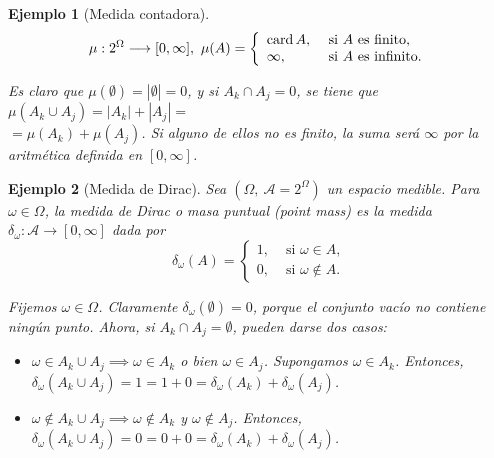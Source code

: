 \documentclass[11pt, a4paper]{article}
\newif\IfInSansMode
\newcommand{\w}{\omega}
\theoremstyle{theorem-style}
\theoremstyle{definition-style}
\theoremstyle{remark-style}
\theoremstyle{example-style}
\newtheorem{ejemplo}{Ejemplo}[section]
\begin{document}
\begin{ejemplo}[Medida contadora]
\[ 
 \mu: 2^\Omega\longrightarrow [0,\infty] , \
 \mu (A) = \left\{ \begin{array}{ll}
                               \text{card\,} A , & \text{ si } A \text{ es finito,}
                               \\
                               \infty , &  \text{ si } A \text{ es infinito.}
                              \end{array}
                              \right.
 \]
 
 Es claro que $\mu(\emptyset) = |\emptyset| = 0$, y si $A_k \cap A_j = 0$, se tiene que $\mu(A_k \cup A_j) = |A_k| + |A_j| = $\\ $= \mu(A_k) + \mu(A_j)$. Si alguno de ellos no es finito, la suma será $\infty$ por la aritmética definida en $[0,\infty]$.
	
\end{ejemplo}

\begin{ejemplo}[Medida de Dirac]
Sea $(\Omega,\ \mathscr A=2^\Omega)$ un espacio medible. Para $\omega\in\Omega$, la medida de Dirac  o masa puntual (point mass) es la medida $\delta_\omega:\mathscr A \longrightarrow [0,\infty ]$ dada por 
 \[
 \delta_\omega (A) = \left\{ \begin{array}{ll}
                                1, & \text{ si } \omega\in A,
                               \\
                               0 , &  \text{ si } \omega\not\in A.
                              \end{array}
                              \right.
 \]
 
 Fijemos $\omega \in \Omega$. Claramente $\delta_\omega(\emptyset) = 0$, porque el conjunto vacío no contiene ningún punto. Ahora, si $A_k \cap A_j = \emptyset$, pueden darse dos casos:
 
\begin{itemize}
    \item $\omega \in A_k\cup A_j \implies \omega \in A_k$ o bien $\omega \in A_j$. Supongamos $\omega \in A_k$. Entonces, $\delta_\omega(A_k\cup A_j) = 1 = 1 + 0 = \delta_\w(A_k) + \delta_\w(A_j)$.
    \item $\w \notin A_k\cup A_j \implies \w \notin A_k$ y $\w \notin A_j$. Entonces, $\delta_\omega(A_k\cup A_j) = 0 = 0 + 0 =\delta_\w(A_k) + \delta_\w(A_j)$.
\end{itemize}
	
\end{ejemplo}
\end{document}
